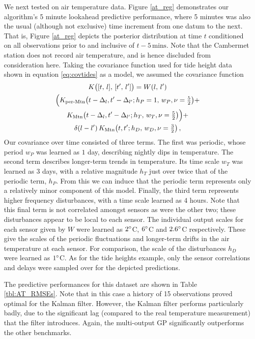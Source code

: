 \documentclass{acmsmall}
\newcommand{\dnt}[1]{_{{#1}}}
\newcommand{\Kl}[1]{K_{\text{#1}}}
\begin{document}
We next tested on air temperature data. Figure \ref{at_reg} demonstrates our algorithm's 5 minute lookahead predictive performance, where 5 minutes was also the usual (although not exclusive) time increment from one datum to the next. That is, Figure \ref{at_reg} depicts the posterior distribution at time $t$ conditioned on all observations prior to and inclusive of $t-5\,\text{mins}$. Note that the Cambermet station does not record air temperature, and is hence discluded from consideration here. Taking the covariance function used for tide height data shown in equation \eqref{eq:covtides} as a model, we assumed the covariance function
\begin{multline*} %
 K\bigl([t,\,l],\,[t',\,l']\bigr)={W}(l,\,l')\\
\Bigl(
\Kl{per-Mtn}\bigl(t-\Delta_{l},t'-\Delta_{l'};h\dnt{P}=1,\,w_P,\nu=\tfrac{5}{2}\bigr)+
\\
\Kl{Mtn}\bigl(t-\Delta_{l},t'-\Delta_{l'};h\dnt{T},\,w\dnt{T},\nu=\tfrac{5}{2}\bigr)
\Bigr)+
\\
\dd{l}{l'}\Kl{Mtn}\bigl(t,t';h\dnt{D},\,w\dnt{D},\nu=\tfrac{3}{2}\bigr)
\,,
\end{multline*}
Our covariance over time consisted of three terms. The first was periodic, whose period $w_P$ was learned as $1$ day, describing nightly dips in temperature. The second term describes longer-term trends in temperature. Its time scale $w\dnt{T}$ was learned as $3$ days, with a relative magnitude $h\dnt{T}$ just over twice that of the periodic term, $h\dnt{P}$. From this we can induce that the periodic term represents only a relatively minor component of this model. Finally, the third term represents higher frequency disturbances, with a time scale learned as $4$ hours. Note that this final term is not correlated amongst sensors as were the other two; these disturbances appear to be local to each sensor. The individual output scales for each sensor given by $W$ were learned as $2^\circ$C, $6^\circ$C and $2.6^\circ$C respectively. These give the scales of the periodic fluctuations and longer-term drifts in the air temperature at each sensor. For comparison, the scale of the disturbances $h\dnt{D}$ were learned as $1^\circ$C. As for the tide heights example, only the sensor correlations and delays were sampled over for the depicted predictions.

The predictive performances for this dataset are shown in Table \ref{tbl:AT_RMSEs}. Note that in this case a history of 15 observations proved optimal for the Kalman filter. However, the Kalman filter performs particularly badly, due to the significant lag (compared to the real temperature measurement) that the filter introduces. Again, the multi-output GP significantly outperforms the other benchmarks.
\end{document}
